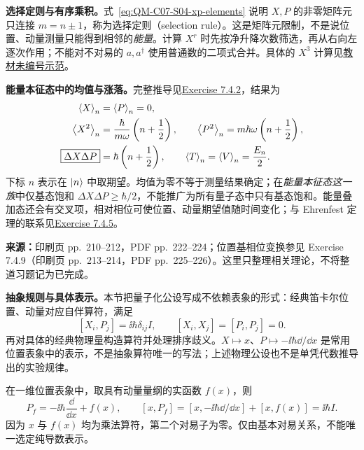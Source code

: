 \textbf{选择定则与有序乘积。}式~\eqref{eq:QM-C07-S04-xp-elements} 说明 $X,P$ 的非零矩阵元只连接 $m=n\pm1$，称为选择定则（selection rule）。这是矩阵元限制，不是说位置、动量测量只能得到相邻的\emph{能量}。计算 $X^r$ 时先按净升降次数筛选，再从右向左逐次作用；不能对不对易的 $a,a^\dagger$ 使用普通数的二项式合并。具体的 $X^3$ 计算见\hyperref[exercise:QM-C07-S04-E00]{教材未编号示范}。

\textbf{能量本征态中的均值与涨落。}完整推导见\hyperref[exercise:QM-C07-S04-E02]{Exercise 7.4.2}，结果为
\begin{align}
  \left\langle X \right\rangle_n&=\left\langle P \right\rangle_n=0,\\
  \left\langle X^2 \right\rangle_n&=\frac{\hbar}{m\omega}\left(n+\frac12\right),\qquad
  \left\langle P^2 \right\rangle_n=m\hbar\omega\left(n+\frac12\right),\\
  \boxed{\Delta X\Delta P}&=\hbar\left(n+\frac12\right),\qquad
  \left\langle T \right\rangle_n=\left\langle V \right\rangle_n=\frac{E_n}{2}.
\end{align}
下标 $n$ 表示在 $\left|n\right\rangle$ 中取期望。均值为零不等于测量结果确定；在\emph{能量本征态这一族}中仅基态饱和 $\Delta X\Delta P\ge\hbar/2$，不能推广为所有量子态中只有基态饱和。能量叠加态还会有交叉项，相对相位可使位置、动量期望值随时间变化；与 Ehrenfest 定理的联系见\hyperref[exercise:QM-C07-S04-E05]{Exercise 7.4.5}。

\textbf{来源：}印刷页 pp.~210--212，PDF pp.~222--224；位置基相位变换参见 Exercise 7.4.9（印刷页 pp.~213--214，PDF pp.~225--226）。这里只整理相关理论，不将整道习题记为已完成。

\textbf{抽象规则与具体表示。}本节把量子化公设写成不依赖表象的形式：经典笛卡尔位置、动量对应自伴算符，满足
\begin{equation}
  \boxed{[X_i,P_j]=\ii\hbar\delta_{ij}I},\qquad
  [X_i,X_j]=[P_i,P_j]=0.
  \label{eq:QM-C07-S04-canonical}
\end{equation}
再对具体的经典物理量构造算符并处理排序歧义。$X\mapsto x$、$P\mapsto-\ii\hbar\dd/\dd x$ 是常用位置表象中的表示，不是抽象算符唯一的写法；上述物理公设也不是单凭代数推导出的实验规律。

在一维位置表象中，取具有动量量纲的实函数 $f(x)$，则
\begin{equation}
  P_f=-\ii\hbar\frac{\dd}{\dd x}+f(x),\qquad
  [x,P_f]=[x,-\ii\hbar\dd/\dd x]+[x,f(x)]=\ii\hbar I.
\end{equation}
因为 $x$ 与 $f(x)$ 均为乘法算符，第二个对易子为零。仅由基本对易关系，不能唯一选定纯导数表示。

